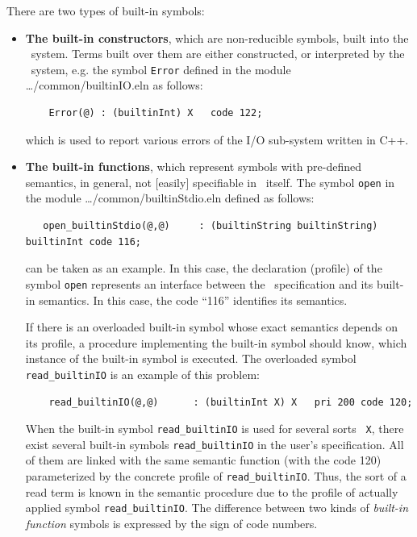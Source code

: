 
There are two types of built-in symbols:
\begin{itemize}
\item 
  {\bf The built-in constructors}, which are non-reducible
  symbols, built into the \elan\ system. Terms built over them are
  either constructed, or interpreted by the \elan\ system, e.g. the
  symbol {\tt Error} defined in the module
  {\ldots/common/builtinIO.eln} as follows:\\
    \begin{verbatim}
    Error(@) : (builtinInt) X   code 122;
    \end{verbatim}
    which is used to report various errors of the I/O sub-system
    written in C++.
\item
    {\bf The built-in functions}, which represent symbols with
    pre-defined semantics, in general, not [easily] specifiable in
    \elan\ itself.  The symbol {\tt open} in  the module
    {\ldots/common/builtinStdio.eln} defined as follows:\\
  \begin{verbatim}
   open_builtinStdio(@,@)     : (builtinString builtinString) builtinInt code 116;
  \end{verbatim}
    can be taken as an example.  In this case, the declaration
    (profile) of the symbol {\tt open} represents an interface between
    the \elan\ specification and its built-in semantics. In this case,
    the code ``116'' identifies its semantics.
    
    If there is an overloaded built-in symbol whose exact semantics
    depends on its profile, a procedure implementing the built-in
    symbol should know, which instance of the built-in symbol is
    executed. The overloaded symbol
    {\tt read\_builtinIO} is an example of this problem:\\
  \begin{verbatim}
    read_builtinIO(@,@)      : (builtinInt X) X   pri 200 code 120;
  \end{verbatim}
    When the built-in symbol {\tt read\_builtinIO} is used for several sorts {\tt
      X}, there exist several built-in symbols {\tt read\_builtinIO} in the
    user's specification.  All of them are linked with the same
    semantic function (with the code 120) parameterized by the
    concrete profile of {\tt read\_builtinIO}. Thus, the sort of a read term is
    known in the semantic procedure due to the profile of actually
    applied symbol {\tt read\_builtinIO}.  The difference between two kinds of
    {\em built-in function} symbols is expressed by the sign of code
    numbers.
\end{itemize}


